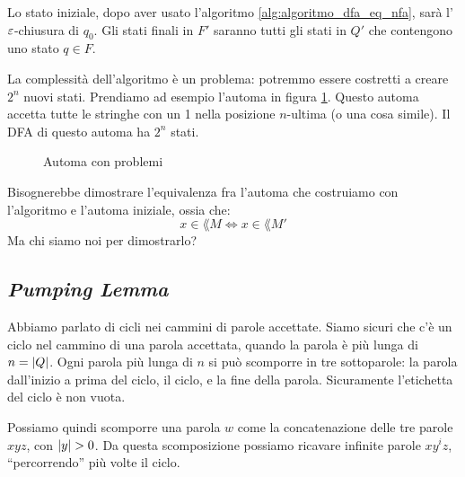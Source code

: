 Lo stato iniziale, dopo aver usato l'algoritmo \ref{alg:algoritmo_dfa_eq_nfa}, sar\`a l'$\varepsilon$-chiusura di $q_0$.
Gli stati finali in $F'$ saranno tutti gli stati in $Q'$ che contengono uno stato $q \in F$.

La complessit\`a dell'algoritmo \`e un problema: potremmo essere costretti a creare $2^n$ nuovi stati.
Prendiamo ad esempio l'automa in figura \ref{fig:nfa_con_problemi}.
Questo automa accetta tutte le stringhe con un 1 nella posizione $n$-ultima (o una cosa simile).
Il DFA di questo automa ha $2^n$ stati.

\begin{figure}
	\centering
	\label{fig:nfa_con_problemi}
	\caption{Automa con problemi}
\end{figure}

Bisognerebbe dimostrare l'equivalenza fra l'automa che costruiamo con l'algoritmo e l'automa iniziale, ossia che:
\[
	x \in \lang{M} \iff x \in \lang{M'}
\]
Ma chi siamo noi per dimostrarlo?

\subsection{\emph{Pumping Lemma}}

Abbiamo parlato di cicli nei cammini di parole accettate.
Siamo sicuri che c'\`e un ciclo nel cammino di una parola accettata, quando la parola \`e pi\`u lunga di $n = \left\lvert{Q}\right\rvert$.
Ogni parola pi\`u lunga di $n$ si pu\`o scomporre in tre sottoparole: la parola dall'inizio a prima del ciclo, il ciclo, e la fine della parola.
Sicuramente l'etichetta del ciclo \`e non vuota.

Possiamo quindi scomporre una parola $w$ come la concatenazione delle tre parole $xyz$, con $\left\lvert{y}\right\rvert > 0$.
Da questa scomposizione possiamo ricavare infinite parole $x y^i z$, ``percorrendo'' pi\`u volte il ciclo.

